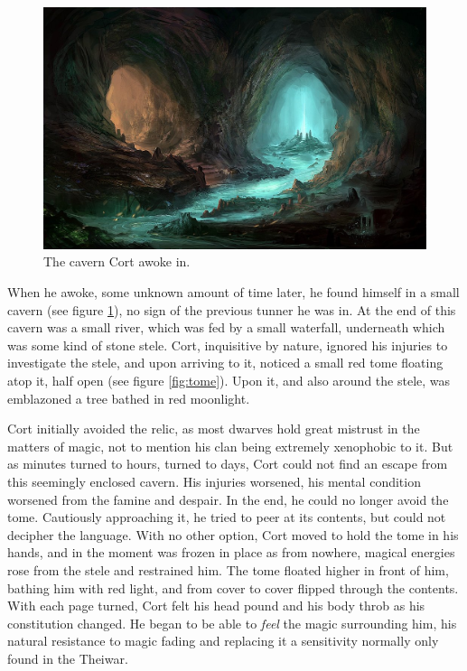 \documentclass[12pt]{article}
\begin{document}
\begin{figure}[!htb]
    \centering
    \includegraphics[width=\textwidth]{./resources/cavern}
    \caption{The cavern Cort awoke in.} \label{fig:cavern}
\end{figure}

When he awoke, some unknown amount of time later, he found himself in a small
cavern (see figure \ref{fig:cavern}), no sign of the previous tunner he was in.
At the end of this cavern was a small river, which was fed by a small waterfall,
underneath which was some kind of stone stele. Cort, inquisitive by nature,
ignored his injuries to investigate the stele, and upon arriving to it, noticed
a small red tome floating atop it, half open (see figure \ref{fig:tome}). Upon
it, and also around the stele, was emblazoned a tree bathed in red moonlight.

Cort initially avoided the relic, as most dwarves hold great mistrust in the
matters of magic, not to mention his clan being extremely xenophobic to it. But
as minutes turned to hours, turned to days, Cort could not find an escape from
this seemingly enclosed cavern. His injuries worsened, his mental condition
worsened from the famine and despair. In the end, he could no longer avoid the
tome. Cautiously approaching it, he tried to peer at its contents, but could not
decipher the language. With no other option, Cort moved to hold the tome in his
hands, and in the moment was frozen in place as from nowhere, magical energies
rose from the stele and restrained him. The tome floated higher in front of him,
bathing him with red light, and from cover to cover flipped through the
contents. With each page turned, Cort felt his head pound and his body throb as
his constitution changed. He began to be able to \textit{feel} the magic
surrounding him, his natural resistance to magic fading and replacing it
a sensitivity normally only found in the Theiwar. 
\end{document}
